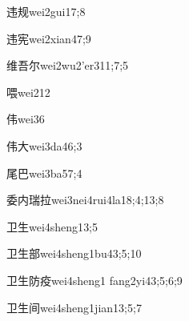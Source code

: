 \begin{verbete}{违规}{wei2gui1}{7;8}
\end{verbete}

\begin{verbete}{违宪}{wei2xian4}{7;9}
\end{verbete}

\begin{verbete}{维吾尔}{wei2wu2'er3}{11;7;5}
\end{verbete}

\begin{verbete}{喂}{wei2}{12}
\end{verbete}

\begin{verbete}{伟}{wei3}{6}
\end{verbete}

\begin{verbete}{伟大}{wei3da4}{6;3}
\end{verbete}

\begin{verbete}{尾巴}{wei3ba5}{7;4}
\end{verbete}

\begin{verbete}{委内瑞拉}{wei3nei4rui4la1}{8;4;13;8}
\end{verbete}

\begin{verbete}{卫生}{wei4sheng1}{3;5}
\end{verbete}

\begin{verbete}{卫生部}{wei4sheng1bu4}{3;5;10}
\end{verbete}

\begin{verbete}{卫生防疫}{wei4sheng1 fang2yi4}{3;5;6;9}
\end{verbete}

\begin{verbete}{卫生间}{wei4sheng1jian1}{3;5;7}
\end{verbete}

